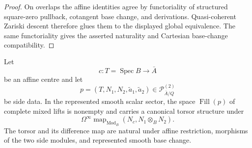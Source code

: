 \begin{proof}
On overlaps the affine identities agree by functoriality of structured square-zero pullback, cotangent base change, and derivations.  Quasi-coherent Zariski descent therefore glues them to the displayed global equivalence.  The same functoriality gives the asserted naturality and Cartesian base-change compatibility.
\end{proof}

\begin{lemma}
\label{lem:var-critical-mixed-fillability}
Let
\[
    c:T=\operatorname{Spec}B\longrightarrow\bar A
\]
be an affine centre and let
\[
    p=(T,N_1,N_2,\widetilde a_1,\widetilde a_2)
    \in\mathcal P^{(2)}_{\bar A/Q}
\]
be side data.  In the represented smooth scalar sector, the space \(\operatorname{Fill}(p)\) of complete mixed lifts is nonempty and carries a canonical torsor structure under
\[
    \boxed{
    \Omega^\infty
    \operatorname{map}_{\operatorname{Mod}_B}
    \left(
      N_c,
      N_1\otimes_BN_2
    \right).
    }
\]
The torsor and its difference map are natural under affine restriction, morphisms of the two side modules, and represented smooth base change.
\end{lemma}

